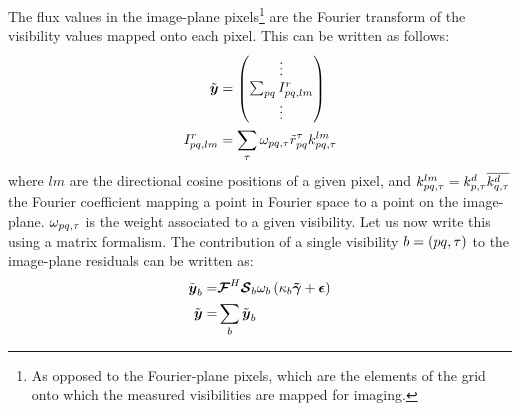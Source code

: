 The flux values in the image-plane pixels\footnote{{As opposed to the Fourier-plane pixels, which are the elements of the grid onto which the measured visibilities are mapped for imaging.}} are the Fourier transform of the visibility values mapped onto each pixel. This can be written as follows:
\begin{alignat}{2}
\displaystyle\muely &= \begin{pmatrix} \vdots \\ \sum_{pq} \Irpqlm \\ \vdots \end{pmatrix} \label{eq.def.muely}\\
\Irpqlm %
        &= \sum_\tnuIndeix \weight{\tnuIndeix} \Rpqt \kpqtlm \label{eq.residual.image}
\end{alignat}
where $lm$ are the directional cosine positions of a given pixel, and $k^{lm}_{pq,\tau}=k_{p,\tau}^d\overline{k_{q,\tau}^d}$ the Fourier coefficient mapping a point in Fourier space to a point on the image-plane. $\omega_{pq,\tau}$ is the weight associated to a given visibility.
\pg
Let us now write this using a matrix formalism. The contribution of a single visibility $b=\left(pq,\tau\right)$ to the image-plane residuals can be written as:
\begin{align}
\tilde{\bm{{{y}}}}_b =& \bm{\mathcal{F}}^H \bm{\mathcal{S}}_b \omega_b \left(\kappa_b \bm{\tilde{\gamma}} + \bm{\epsilon} \right)\\
\tilde{\bm{{{y}}}}   =& \sum_b \tilde{\bm{{{y}}}}_b\label{qwdqwdq}
\end{align}

%

